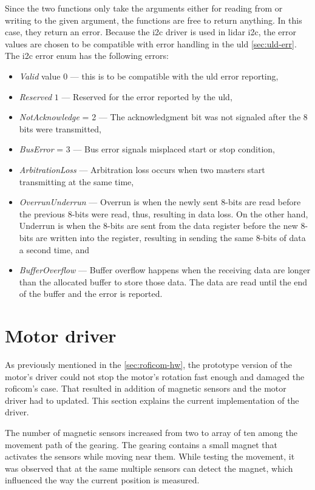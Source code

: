 \documentclass[
  digital,     %
  oneside,     %
  nosansbold,  %
  nocolorbold, %
  nolof,         %
  nolot,         %
]{fithesis4}
\begin{document}
{{{Since the two functions only take the arguments either for reading from or writing to the given argument, the functions are free to return anything. In this case, they return an error. Because the \acrshort{i2c} driver is used in \acrshort{lidar} \acrshort{i2c}, the error values are chosen to be compatible with error handling in the \acrshort{uld} \autoref{sec:uld-err}. The \acrshort{i2c} error enum has the following errors:
\begin{itemize}
    \item \emph{Valid} value $0$ --- this is to be compatible with the \acrshort{uld} error reporting,
    \item \emph{Reserved} $1$ --- Reserved for the error reported by the \acrshort{uld},
    \item \emph{NotAcknowledge} = 2 --- The acknowledgment bit was not signaled after the 8 bits were transmitted,
    \item \emph{BusError} = 3 --- Bus error signals misplaced start or stop condition,
    \item \emph{ArbitrationLoss} --- Arbitration loss occurs when two masters start transmitting at the same time,
    \item \emph{OverrunUnderrun} --- Overrun is when the newly sent 8-bits are read before the previous 8-bits were read, thus, resulting in data loss. On the other hand, Underrun is when the 8-bits are sent from the data register before the new 8-bits are written into the register, resulting in sending the same 8-bits of data a second time, and
    \item \emph{BufferOverflow} --- Buffer overflow happens when the receiving data are longer than the allocated buffer to store those data. The data are read until the end of the buffer and the error is reported.
\end{itemize}

\section{ Motor driver }

As previously mentioned in the \autoref{sec:roficom-hw}, the prototype version of the motor's driver could not stop the motor's rotation fast enough and damaged the \acrshort{roficom}'s case. That resulted in addition of magnetic sensors and the motor driver had to updated. This section explains the current implementation of the driver.

The number of magnetic sensors increased from two to array of ten among the movement path of the gearing. The gearing contains a small magnet that activates the sensors while moving near them. While testing the movement, it was observed that at the same multiple sensors can detect the magnet, which influenced the way the current position is measured.

}}}
\end{document}
